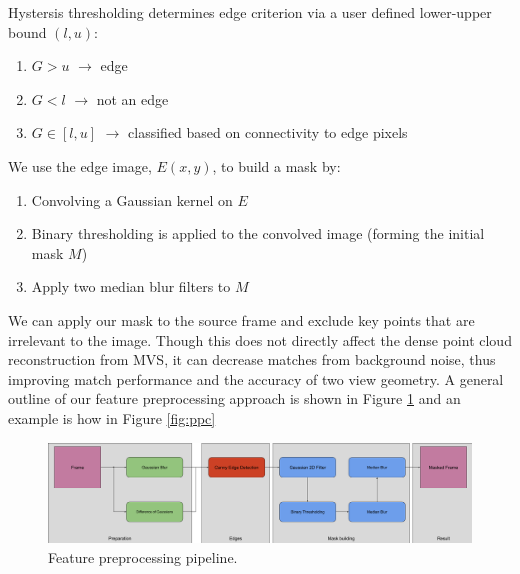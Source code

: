 \documentclass[conference,compsoc]{IEEEtran}
\begin{document}
Hystersis thresholding determines edge criterion via a user defined 
lower-upper bound $(l,u)$:
\begin{enumerate}[i]
    \item $G > u$ $\to$ edge
    \item $G < l$ $\to$ not an edge
    \item $G \in [l,u]$ $\to$ classified based on connectivity to edge pixels
\end{enumerate}
We use the edge image, $E(x,y)$, to build a mask by:
\begin{enumerate}[1.]
    \item Convolving a Gaussian kernel on $E$
    \item Binary thresholding is applied to the convolved image (forming the initial mask $M$)
    \item Apply two median blur filters to $M$
\end{enumerate}
We can apply our mask to the source frame and exclude key points that
are irrelevant to the image. Though this does not directly affect the dense point cloud
reconstruction from MVS, it can decrease matches from background noise, thus 
improving match performance and the accuracy of two view geometry. A general 
outline of our feature preprocessing approach is shown in Figure \ref{fig:ppc_pipe}
and an example is how in Figure \ref{fig:ppc}
\begin{figure}[ht!]
    \centering
    \includegraphics[width=.4\textwidth]{figures/preproc pipeline.png}
    \caption{Feature preprocessing pipeline.}
    \label{fig:ppc_pipe}
\end{figure}
\end{document}
